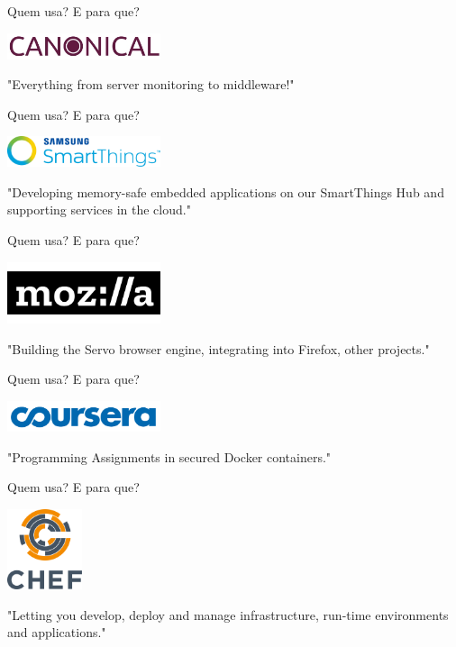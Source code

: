 \documentclass[aspectratio=169]{beamer}
\begin{document}
\begin{frame}{Quem usa? E para que?}
	\begin{center}
		\includegraphics[width=4.5cm]{imgs/canonical.jpeg}	
		
		"Everything from server monitoring to middleware!"
	\end{center}
\end{frame}

\begin{frame}{Quem usa? E para que?}
	\begin{center}
		\includegraphics[width=4.5cm]{imgs/smartthings.png}	
		
		"Developing memory-safe embedded applications on our SmartThings Hub and supporting services in the cloud."
	\end{center}
\end{frame}

\begin{frame}{Quem usa? E para que?}
	\begin{center}
		\includegraphics[width=4.5cm]{imgs/mozilla.png}	
		
		"Building the Servo browser engine, integrating into Firefox, other projects."
	\end{center}
\end{frame}

\begin{frame}{Quem usa? E para que?}
	\begin{center}
		\includegraphics[width=4.5cm]{imgs/coursera.png}	
		
		"Programming Assignments in secured Docker containers."
	\end{center}
\end{frame}

\begin{frame}{Quem usa? E para que?}
	\begin{center}
		\includegraphics[width=2.2cm]{imgs/chef.png}	
		
		"Letting you develop, deploy and manage infrastructure, run-time environments and applications."
	\end{center}
\end{frame}
\end{document}
